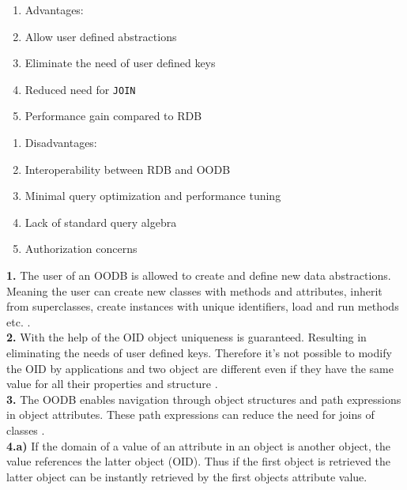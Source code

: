 \documentclass{cslthse-msc}
\begin{document}
\begin{center}
\noindent\begin{minipage}[t]{0.5\linewidth}
    \begin{enumerate}
    \item[] Advantages:
    \item{Allow user defined abstractions}
    \item{Eliminate the need of user defined keys}
    \item{Reduced need for \texttt{JOIN}}
    \item{Performance gain compared to RDB}
    \end{enumerate}
    \end{minipage}%
    \begin{minipage}[t]{0.6\linewidth}
    \begin{enumerate}
    \item[] Disadvantages: 
    \item{Interoperability between RDB and OODB }
    \item{Minimal query optimization and performance tuning}
    \item{Lack of standard query algebra}
    \item{Authorization concerns}
    \end{enumerate}
\end{minipage}
\end{center}
\begin{flushright}
\cite{OODBMS}
\end{flushright}
\textbf{1.} The user of an OODB is allowed to create and define new data abstractions. Meaning the user can create new classes with methods and attributes, inherit from superclasses, create instances with unique identifiers, load and run methods etc. \cite{userdefinedabstractions}.\\ \textbf{2.} With the help of the OID object uniqueness is guaranteed. Resulting in eliminating the needs of user defined keys. Therefore it's not possible to modify the OID by applications and two object are different even if they have the same value for all their properties and structure \cite{identity}.\\\textbf{3.} The OODB enables navigation through object structures and path expressions in object attributes. These path expressions can reduce the need for joins of classes \cite{userdefinedabstractions}.\\\textbf{4.}\textbf{a)} If the domain of a value of an attribute in an object is another object, the value references the latter object (OID). Thus if the first object is retrieved the latter object can be instantly retrieved by the first objects attribute value.\\
\end{document}
